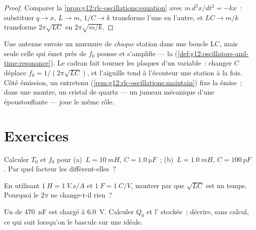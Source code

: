 \begin{proof}
Comparer la \cref{prop:g12:rlc-oscillations:equation} avec
$m\,d^2x/dt^2 = -kx$~: substituer $q \to x$, $L \to m$, $1/C \to k$
transforme l'une en l'autre, et $LC \to m/k$ transforme
$2\pi\sqrt{LC}$ en $2\pi\sqrt{m/k}$.
\end{proof}

\begin{example}\label{ex:g12:rlc-oscillations:tuning}
Une antenne envoie un murmure de \emph{chaque} station dans une
boucle LC, mais seule celle qui émet près de $f_0$ pousse  et
s'amplifie --- la 
(\cref{def:g12:oscillators-and-time:resonance}). Le cadran fait tourner les
plaques d'un  variable~: changer $C$ déplace
$f_0 = 1/(2\pi\sqrt{LC})$, et l'aiguille tend à l'écouteur une
station à la fois. Côté émission, un
 entretenu
(\cref{rem:g12:rlc-oscillations:maintain}) fixe la
 émise~; dans une montre, un
cristal de quartz --- un jumeau mécanique d'une
 époustouflante --- joue le même rôle.
\end{example}

\section{Exercices}

\begin{exercise}[$\star$]\label{exo:g12:rlc-oscillations:1}
Calculer $T_0$ et $f_0$ pour (a)~$L = \qty{10}{mH}$,
$C = \qty{1.0}{\micro F}$~; (b)~$L = \qty{1.0}{mH}$,
$C = \qty{100}{pF}$. Par quel facteur les  diffèrent-elles~?
\end{exercise}

\begin{exercise}[$\star$]\label{exo:g12:rlc-oscillations:2}
En utilisant $\qty{1}{H} = \qty{1}{V.s/A}$ et $\qty{1}{F} =
\qty{1}{C/V}$, montrer  par
 que $\sqrt{LC}$ est un temps. Pourquoi le
$2\pi$ ne change-t-il rien~?
\end{exercise}

\begin{exercise}[$\star$]\label{exo:g12:rlc-oscillations:3}
Un  de \qty{470}{nF} est chargé à
\qty{6.0}{V}. Calculer $Q_0$ et l' stockée~;
décrire, sans calcul, ce qui suit lorsqu'on le bascule sur une
 idéale.
\end{exercise}

